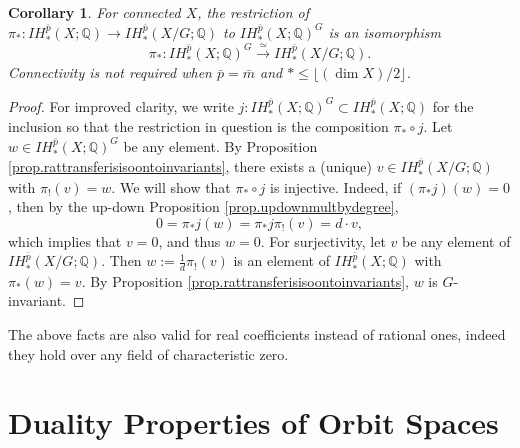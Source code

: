 \documentclass{amsart}
\newtheorem{cor}[thm]{Corollary}
\theoremstyle{definition}
\theoremstyle{remark}
\newcommand {\rat}   {\ensuremath{\mathbb{Q}}}
\newcommand {\bp}    {{\ensuremath{\bar{p}}}}
\newcommand {\bm}    {{\ensuremath{\bar{m}}}}
\begin{document}
\begin{cor} \label{cor.pistarisorestrinvs}
For connected $X$,
the restriction of $\pi_*: IH^\bp_* (X;\rat) \to IH^\bp_* (X/G;\rat)$
to $IH^\bp_* (X;\rat)^G$ is an isomorphism
\[ \pi_*: IH^\bp_* (X;\rat)^G \stackrel{\simeq}{\longrightarrow} 
        IH^\bp_* (X/G;\rat). \]
Connectivity is not required when
$\bp = \bm$ and $* \leq \lfloor (\dim X)/2 \rfloor$.
\end{cor}
\begin{proof}
For improved clarity, we write $j: IH^\bp_* (X;\rat)^G \subset
IH^\bp_* (X;\rat)$ for the inclusion so that the restriction in question
is the composition $\pi_* \circ j$.
Let $w\in IH^\bp_* (X;\rat)^G$ be any element.
By Proposition \ref{prop.rattransferisisoontoinvariants},
there exists a (unique) $v\in IH^\bp_* (X/G;\rat)$ with 
$\pi_! (v)=w$. We will show that $\pi_* \circ j$ is injective.
Indeed, if $(\pi_* j)(w)=0$, then by the up-down
Proposition \ref{prop.updownmultbydegree},
\[ 0 = \pi_* j (w) = \pi_* j \pi_! (v) = d\cdot v,\]
which implies that $v=0$, and thus $w=0$.
For surjectivity, let $v$ be any element of $IH^\bp_* (X/G;\rat)$.
Then $w:= \frac{1}{d} \pi_! (v)$ is an element of $IH^\bp_* (X;\rat)$
with $\pi_* (w)=v$.
By Proposition \ref{prop.rattransferisisoontoinvariants}, $w$ is $G$-invariant.
\end{proof}
The above facts are also valid for real coefficients instead of rational
ones, indeed they hold over any field of characteristic zero.




\section{Duality Properties of Orbit Spaces}
\label{sec.dualitypropsoforbitspaces}
\end{document}
